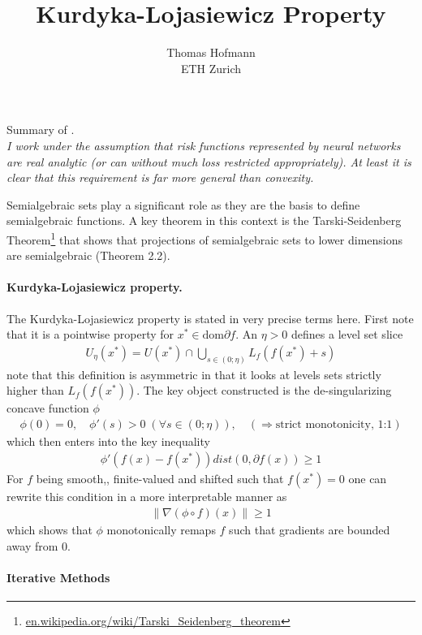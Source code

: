 \documentclass{article}
\title{Kurdyka-Lojasiewicz Property}
\author{Thomas Hofmann\\ ETH Zurich}
\begin{document}
\maketitle

\noindent  Summary of \cite{attouch2013convergence}.\\

\noindent \textit{
I work under the assumption that risk functions represented by neural networks are real analytic (or can without much loss restricted appropriately). At least it is clear that this requirement is far more general than convexity.} 

Semialgebraic sets play a significant role as they are the basis to define semialgebraic functions. A key theorem in this context is the Tarski-Seidenberg Theorem\footnote{\url{en.wikipedia.org/wiki/Tarski_Seidenberg_theorem}} that shows that projections of semialgebraic sets to lower dimensions are semialgebraic (Theorem 2.2).

\paragraph{Kurdyka-Lojasiewicz property. }
The Kurdyka-Lojasiewicz property is stated in very precise terms here. First note that it is a pointwise property for $x^* \in \text{dom} \partial f$. An $\eta>0$ defines a level set slice 
\begin{align}
U_\eta(x^*) = U(x^*) \cap \bigcup_{s\in (0;\eta)} L_f(f(x^*)+s)
\end{align}
note that this definition is asymmetric in that it looks at levels sets strictly higher than $L_f(f(x^*))$.  The key object constructed is the de-singularizing concave function $\phi$
\begin{align}
\phi(0)=0, \quad \phi'(s) >0 \; (\forall s \in (0;\eta)), \quad (\Rightarrow \text{strict monotonicity, 1:1}) 
\end{align}
which then enters into the key inequality
\begin{align}
\phi'(f(x)-f(x^*)) dist(0,\partial f(x))  \ge 1
\end{align}
For $f$ being smooth,, finite-valued and shifted such that $f(x^*)=0$ one can rewrite this condition in a more interpretable manner as
\begin{align}
\| \nabla(\phi \circ f)(x) \| \ge 1
\end{align}
which shows that $\phi$ monotonically remaps $f$ such that gradients are bounded away from $0$. 

\paragraph{Iterative Methods}
\end{document}
